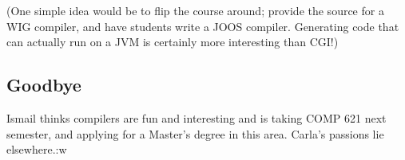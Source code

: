 \documentclass{WigReport}
\begin{document}
(One simple idea would be to flip the course around; provide the source for
a WIG compiler, and have students write a JOOS compiler. Generating code
that can actually run on a JVM is certainly more interesting than CGI!)

\subsection{Goodbye}
Ismail thinks compilers are fun and interesting and is taking COMP 621 
next semester, and applying for a Master's degree in this area. Carla's 
passions lie elsewhere.:w
\end{document}
